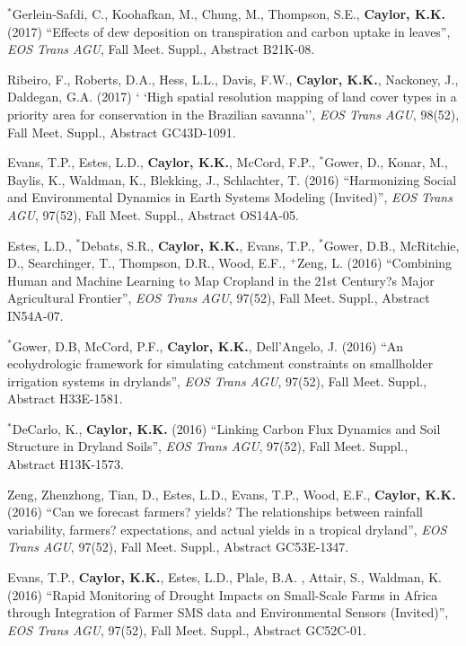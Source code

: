 \documentclass[10pt]{report}
\begin{document}
\begin{etaremune}
\item $^{*}$Gerlein-Safdi, C., Koohafkan, M., Chung, M., Thompson, S.E., \textbf{Caylor, K.K.} (2017) ``Effects of dew deposition on transpiration and carbon uptake in leaves'', \emph{EOS Trans AGU}, Fall Meet. Suppl., Abstract B21K-08.

\item  Ribeiro, F., Roberts, D.A., Hess, L.L., Davis, F.W.,  \textbf{Caylor, K.K.}, Nackoney, J., Daldegan, G.A. (2017) `	`High spatial resolution mapping of land cover types in a priority area for conservation in the Brazilian savanna'', \emph{EOS Trans AGU}, 98(52), Fall Meet. Suppl., Abstract GC43D-1091.
 
\item Evans, T.P., Estes, L.D., \textbf{Caylor, K.K.},  McCord, F.P., $^{*}$Gower, D., Konar, M., Baylis, K., Waldman, K., Blekking, J., Schlachter, T. (2016) ``Harmonizing Social and Environmental Dynamics in Earth Systems Modeling (Invited)'', \emph{EOS Trans AGU}, 97(52), Fall Meet. Suppl., Abstract OS14A-05.

\item Estes, L.D., $^{*}$Debats, S.R., \textbf{Caylor, K.K.}, Evans, T.P., $^{*}$Gower, D.B.,  McRitchie, D., Searchinger, T., Thompson, D.R., Wood, E.F., $^{+}$Zeng, L. (2016) ``Combining Human and Machine Learning to Map Cropland in the 21st Century?s Major Agricultural Frontier'', \emph{EOS Trans AGU}, 97(52), Fall Meet. Suppl., Abstract IN54A-07.

\item $^{*}$Gower, D.B, McCord, P.F., \textbf{Caylor, K.K.}, Dell'Angelo, J. (2016) ``An ecohydrologic framework for simulating catchment constraints on smallholder irrigation systems in drylands'',  \emph{EOS Trans AGU}, 97(52), Fall Meet. Suppl., Abstract H33E-1581. 

\item $^{*}$DeCarlo, K.,  \textbf{Caylor, K.K.} (2016) ``Linking Carbon Flux Dynamics and Soil Structure in Dryland Soils'', \emph{EOS Trans AGU}, 97(52), Fall Meet. Suppl., Abstract H13K-1573.

\item Zeng, Zhenzhong, Tian, D., Estes, L.D., Evans, T.P., Wood, E.F., \textbf{Caylor, K.K.} (2016) ``Can we forecast farmers? yields? The relationships between rainfall variability, farmers? expectations, and actual yields in a tropical dryland'', \emph{EOS Trans AGU}, 97(52), Fall Meet. Suppl., Abstract GC53E-1347.

\item Evans, T.P.,  \textbf{Caylor, K.K.}, Estes, L.D., Plale, B.A. , Attair, S., Waldman, K. (2016) ``Rapid Monitoring of Drought Impacts on Small-Scale Farms in Africa through Integration of Farmer SMS data and Environmental Sensors (Invited)'',  \emph{EOS Trans AGU}, 97(52), Fall Meet. Suppl., Abstract GC52C-01.


\end{etaremune}
\end{document}
